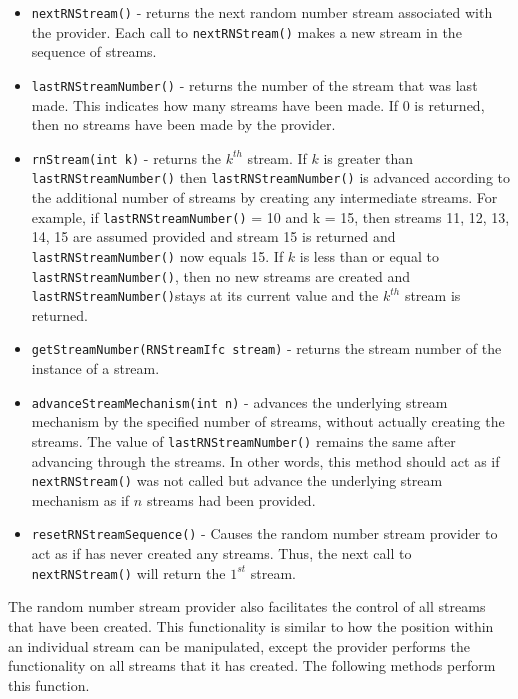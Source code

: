 \documentclass[
]{book}
\providecommand{\tightlist}{%
  \setlength{\itemsep}{0pt}\setlength{\parskip}{0pt}}
\theoremstyle{definition}
\theoremstyle{definition}
\theoremstyle{definition}
\theoremstyle{definition}
\theoremstyle{remark}
\begin{document}
\begin{itemize}
\tightlist
\item
  \texttt{nextRNStream()} - returns the next random number stream associated with the provider. Each call
  to \texttt{nextRNStream()} makes a new stream in the sequence of streams.
\item
  \texttt{lastRNStreamNumber()} - returns the number of the stream that was last made. This indicates how
  many streams have been made. If \(0\) is returned, then no streams have been made by the provider.
\item
  \texttt{rnStream(int\ k)} - returns the \(k^{th}\) stream. If \(k\) is greater than \texttt{lastRNStreamNumber()} then \texttt{lastRNStreamNumber()} is advanced according to the additional number of streams by creating any intermediate streams. For example, if \texttt{lastRNStreamNumber()} = 10 and k = 15, then streams 11, 12, 13, 14, 15 are assumed provided and stream 15 is returned and \texttt{lastRNStreamNumber()} now equals 15. If \(k\) is less than or equal to \texttt{lastRNStreamNumber()}, then no new streams are created and \texttt{lastRNStreamNumber()}stays at its current value and the \(k^{th}\) stream is returned.
\item
  \texttt{getStreamNumber(RNStreamIfc\ stream)} - returns the stream number of the instance of a stream.
\item
  \texttt{advanceStreamMechanism(int\ n)} - advances the underlying stream mechanism by the specified number of streams, without actually creating the streams. The value of \texttt{lastRNStreamNumber()} remains the same after advancing through
  the streams. In other words, this method should act as if \texttt{nextRNStream()} was not called but advance the underlying stream mechanism as if \(n\) streams had been provided.
\item
  \texttt{resetRNStreamSequence()} - Causes the random number stream provider to act as if has never created any streams. Thus,
  the next call to \texttt{nextRNStream()} will return the \(1^{st}\) stream.
\end{itemize}

The random number stream provider also facilitates the control of all streams that have been created. This functionality is similar to how the position within an individual stream can be manipulated, except the provider performs the functionality on all streams that it has created. The following methods perform this function.
\end{document}
